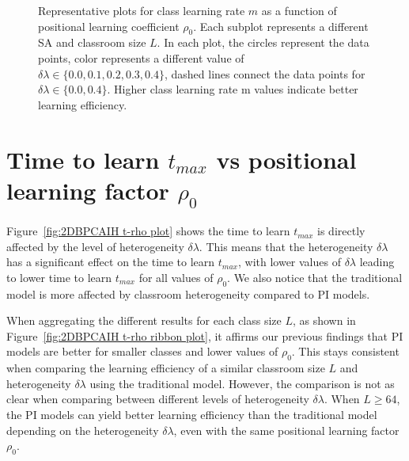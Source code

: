 \begin{figure}[htbp!]
   \caption[Positional learning factor $\rho_0$ dependence of class learning rate $m$ for the heterogeneous classroom model]{Representative plots for class learning rate $m$ as a function of positional learning coefficient $\rho_0$.
   Each subplot represents a different SA and classroom size $L$.
   In each plot, the circles represent the data points, color represents a different value of $\delta\lambda \in \lbrace 0.0, 0.1, 0.2, 0.3, 0.4 \rbrace$, dashed lines connect the data points for $\delta\lambda \in \lbrace 0.0, 0.4 \rbrace$.
   Higher class learning rate m values indicate better learning efficiency.
   }
   \label{fig:2DBPCAIH m rho plot}
\end{figure}

\newpage %

\section{Time to learn $t_{max}$ vs positional learning factor $\rho_0$}\label{sec:BPCAIH t vs rho}
Figure~\ref{fig:2DBPCAIH t-rho plot} shows the time to learn $t_{max}$ is directly affected by the level of heterogeneity $\delta\lambda$. 
This means that the heterogeneity $\delta\lambda$ has a significant effect on the time to learn $t_{max}$, with lower values of $\delta\lambda$ leading to lower time to learn $t_{max}$ for all values of $\rho_0$. 
We also notice that the traditional model is more affected by classroom heterogeneity compared to PI models.

When aggregating the different results for each class size $L$, as shown in Figure~\ref{fig:2DBPCAIH t-rho ribbon plot}, it affirms our previous findings that PI models are better for smaller classes and lower values of $\rho_0$.
This stays consistent when comparing the learning efficiency of a similar classroom size $L$ and heterogeneity $\delta\lambda$ using the traditional model.
However, the comparison is not as clear when comparing between different levels of heterogeneity $\delta\lambda$.
When $L\geq64$, the PI models can yield better learning efficiency than the traditional model depending on the heterogeneity $\delta\lambda$, even with the same positional learning factor $\rho_0$.

